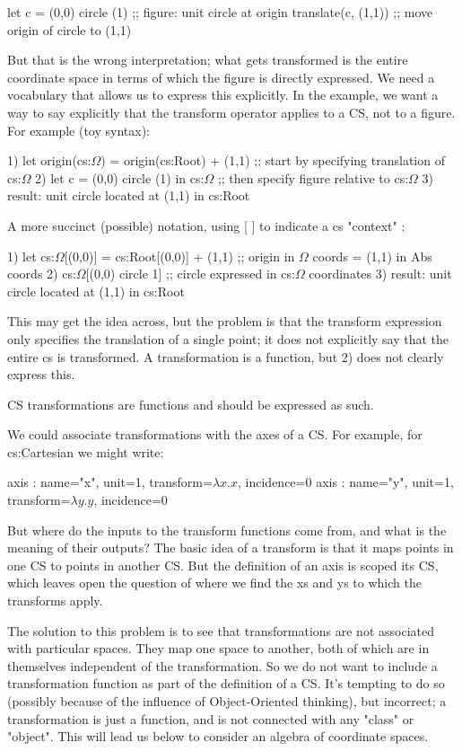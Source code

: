 \documentclass[reqno,12pt]{tufte-handout}
\numberwithin{equation}{subsection}
\numberwithin{equation}{subsection}
\begin{document}
let c = (0,0) circle (1)  ;; figure: unit circle at origin
translate(c, (1,1))	      ;; move origin of circle to (1,1)

But that is the wrong interpretation; what gets transformed is the
entire coordinate space in terms of which the figure is directly
expressed.  We need a vocabulary that allows us to express this
explicitly.  In the example, we want a way to say explicitly that the
transform operator applies to a CS, not to a figure.  For example (toy syntax):

1)	  let origin(cs:$\Omega$) = origin(cs:Root) + (1,1)  ;; start by specifying translation of cs:$\Omega$
2)	  let c = (0,0) circle (1) in cs:$\Omega$  ;; then specify figure relative to cs:$\Omega$
3)	  result: unit circle located at (1,1) in cs:Root

A more succinct (possible) notation, using [ ] to indicate a cs "context" :

1)	  let cs:$\Omega$[(0,0)] = cs:Root[(0,0)] + (1,1)  ;; origin in $\Omega$ coords = (1,1) in Abs coords
2)	  cs:$\Omega$[(0,0) circle 1]   ;; circle expressed in cs:$\Omega$ coordinates
3)	  result: unit circle located at (1,1) in cs:Root

This may get the idea across, but the problem is that the transform
expression only specifies the translation of a single point; it does
not explicitly say that the entire cs is transformed.  A
transformation is a function, but 2) does not clearly express this.

CS transformations are functions and should be expressed as such.

We could associate transformations with the axes of a CS.  For
example, for cs:Cartesian we might write:

axis : {name="x", unit=1, transform=\(\lambda x.x\), incidence=0}
axis : {name="y", unit=1, transform=\(\lambda y.y\), incidence=0}

But where do the inputs to the transform functions come from, and what
is the meaning of their outputs?  The basic idea of a transform is
that it maps points in one CS to points in another CS.  But the
definition of an axis is scoped its CS, which leaves open the question
of where we find the xs and ys to which the transforms apply.

The solution to this problem is to see that transformations are not
associated with particular spaces.  They map one space to another,
both of which are in themselves independent of the transformation.  So
we do not want to include a transformation function as part of the
definition of a CS.  It's tempting to do so (possibly because of the
influence of Object-Oriented thinking), but incorrect; a
transformation is just a function, and is not connected with any
"class" or "object".  This will lead us below to consider an algebra
of coordinate spaces.
\end{document}
